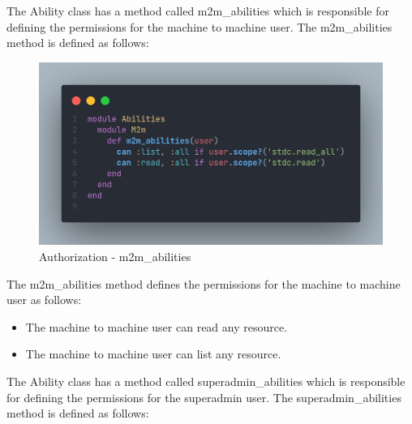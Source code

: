 \begin{justify}
        \vspace{0.25cm}
        \newendline The Ability class has a method called m2m\_abilities which is responsible for defining the permissions for the machine to machine user. The m2m\_abilities method is defined as follows:

        \begin{figure}[H]
            \centerline{\includegraphics[width=150mm,scale=1]{figures/implementation_and_testing/implementation/backend/M2mAbilities.png}}
            \caption{Authorization - m2m\_abilities}
        \end{figure}

        \newendline The m2m\_abilities method defines the permissions for the machine to machine user as follows:
                    \begin{itemize}
                        \item The machine to machine user can read any resource.
                        \item The machine to machine user can list any resource.
                    \end{itemize}

        \vspace{0.25cm}
        \newendline The Ability class has a method called superadmin\_abilities which is responsible for defining the permissions for the superadmin user. The superadmin\_abilities method is defined as follows:


\end{justify}
